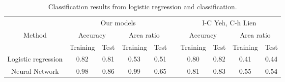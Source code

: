 

\begin{table}[!h]
\label{tab:results_classification}
\caption{Classification results from logistic regression and classification.}
\begin{tabular}{cccccccccc}
                                          & \multicolumn{4}{c}{Our models}                                                                                            &                       & \multicolumn{4}{c}{I-C Yeh, C-h Lien}                                                                                 \\ \cline{1-5} \cline{7-10} 
\multicolumn{1}{|c|}{Method}              & \multicolumn{2}{c|}{Accuracy}                               & \multicolumn{2}{c|}{Area ratio}                             & \multicolumn{1}{c|}{} & \multicolumn{2}{c|}{Accuracy}                             & \multicolumn{2}{c|}{Area ratio}                           \\ \cline{1-5} \cline{7-10} 
\multicolumn{1}{|c|}{}                    & \multicolumn{1}{c|}{Training} & \multicolumn{1}{c|}{Test}   & \multicolumn{1}{c|}{Training} & \multicolumn{1}{c|}{Test}   & \multicolumn{1}{c|}{} & \multicolumn{1}{c|}{Training} & \multicolumn{1}{c|}{Test} & \multicolumn{1}{c|}{Training} & \multicolumn{1}{c|}{Test} \\ \cline{1-5} \cline{7-10} 
\multicolumn{1}{|c|}{Logistic regression} & \multicolumn{1}{c|}{0.82}     & \multicolumn{1}{c|}{0.81}   & \multicolumn{1}{c|}{0.53}     & \multicolumn{1}{c|}{0.51}   & \multicolumn{1}{c|}{} & \multicolumn{1}{c|}{0.80}     & \multicolumn{1}{c|}{0.82} & \multicolumn{1}{c|}{0.41}     & \multicolumn{1}{c|}{0.44} \\ \cline{1-5} \cline{7-10} 
\multicolumn{1}{|c|}{Neural Network}      & \multicolumn{1}{c|}{0.98}   & \multicolumn{1}{c|}{0.86} & \multicolumn{1}{c|}{0.99}   & \multicolumn{1}{c|}{0.65} & \multicolumn{1}{c|}{} & \multicolumn{1}{c|}{0.81}     & \multicolumn{1}{c|}{0.83} & \multicolumn{1}{c|}{0.55}     & \multicolumn{1}{c|}{0.54} \\ \cline{1-5} \cline{7-10} 
\end{tabular}
\end{table}













